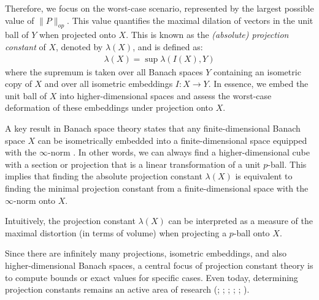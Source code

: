 Therefore, we focus on the worst-case scenario, represented by the largest possible value of $\|P\|_{op}$. This value quantifies the maximal dilation of vectors in the unit ball of $Y$ when projected onto $X$.  This is known as the \emph{(absolute) projection constant} of $X$, denoted by $\lambda(X)$, and is defined as:
\begin{align*}
\lambda(X) = \sup \lambda(I(X), Y)
\end{align*}
where the supremum is taken over all Banach spaces $Y$ containing an isometric copy of $X$ and over all isometric embeddings $I: X \rightarrow Y$. In essence, we embed the unit ball of $X$ into higher-dimensional spaces and assess the worst-case deformation of these embeddings under projection onto $X$.

A key result in Banach space theory states that any finite-dimensional Banach space $X$ can be isometrically embedded into a finite-dimensional space equipped with the $\infty$-norm \cite{defantProjectionConstantsSpaces2022}. In other words, we can always find a higher-dimensional cube with a section or projection that is a linear transformation of a unit $p$-ball. This implies that finding the absolute projection constant $\lambda(X)$ is equivalent to finding the minimal projection constant from a finite-dimensional space with the $\infty$-norm onto $X$.

Intuitively, the projection constant $\lambda(X)$ can be interpreted as a measure of the maximal distortion (in terms of volume) when projecting a $p$-ball onto $X$.

Since there are infinitely many projections, isometric embeddings, and also higher-dimensional Banach spaces, a central focus of projection constant theory is to compute bounds or exact values for specific cases.  Even today, determining projection constants remains an active area of research (\cite{deregowskaSimpleProofGrunbaum2023}; \cite{defantProjectionConstantsSpaces2022}; \cite{deregowskaValueFifthMaximal2022}; \cite{chalmersMINIMALPROJECTIONSABSOLUTEPROJECTION}; \cite{bassoComputationMaximalProjection2019}; \cite{foucartMaximalRelativeProjection2017}).

